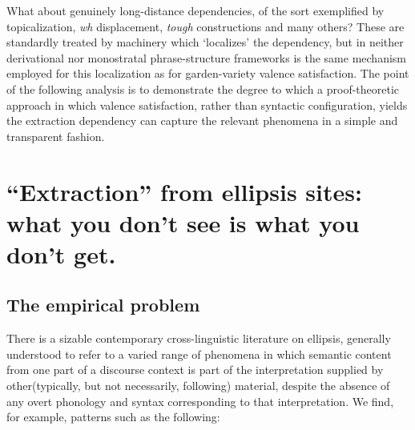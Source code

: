 \documentclass[output=paper,colorlinks,citecolor=brown]{langscibook}
\begin{document}
What about genuinely long-distance dependencies, of the sort
exemplified by topicalization, \textit{wh} displacement, \textit{tough}
constructions and many others? These are standardly treated by
machinery which `localizes' the dependency, but in neither
derivational nor monostratal phrase-structure frameworks is the same
mechanism employed for this localization as for garden-variety valence
satisfaction. The point of the following analysis is to demonstrate
the degree to which a proof-theoretic approach in which valence satisfaction,
rather than syntactic configuration, yields the extraction dependency
can capture the relevant phenomena in a simple and transparent fashion.

\section{``Extraction'' from ellipsis sites: what you don't see is what you don't get.}

\subsection{The empirical problem}

There is a sizable contemporary cross-linguistic literature on
ellipsis, generally understood to refer to a varied range of phenomena
in which semantic content from one part of a discourse context is
part of the interpretation supplied by other(typically, but
not necessarily, following)  material, despite the absence of any
overt phonology and syntax corresponding to that interpretation. We
find, for example, patterns such as the following:
\end{document}
